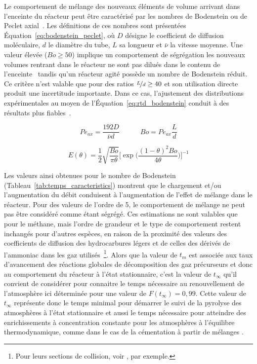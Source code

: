 Le comportement de mélange des nouveaux éléments de volume arrivant dans l'enceinte du réacteur peut être caractérisé par les nombres de Bodenstein ou de Peclet axial~\cite{Becker1998177,Fogler1999}.  Les définitions de ces nombres sont présentées Équation~\ref{eq:bodenstein_peclet}, où $D$ désigne le coefficient de diffusion moléculaire, $d$ le diamètre du tube, $L$ sa longueur et $\bar{\nu}$ la vitesse moyenne. Une valeur élevée ($Bo{}\geq{}50$) implique un comportement de ségrégation \textendash{} les nouveaux volumes rentrant dans le réacteur ne sont pas dilués dans le contenu de l'enceinte~\cite{Becker1998177} \textendash{} tandis qu'un réacteur agité possède un nombre de Bodenstein réduit. Ce critère n'est valable que pour des ratios $\nicefrac{L}{d}\geq40$ et son utilisation directe produit une incertitude importante. Dans ce cas, l'ajustement des distributions expérimentales au moyen de l'Équation~\ref{eq:rtd_bodenstein} conduit à des résultats plus fiables~\citep{Becker1998177}.

\begin{equation}
  Pe_{ax}=\frac{192D}{\bar{\nu}d}\quad\quad\quad 
  Bo=Pe_{ax}\frac{L}{d}
  \label{eq:bodenstein_peclet}
\end{equation}

\begin{equation}
  E(\theta)=\frac{1}{2}\sqrt{\frac{Bo}{\pi\theta}}
    \biggr[\exp\biggr(\frac{(1-\theta)^{2}Bo}{4\theta}\biggr)\biggr]^{-1}
  \label{eq:rtd_bodenstein}
\end{equation}

Les valeurs ainsi obtenues pour le nombre de Bodenstein (Tableau~\ref{tab:temps_caracteristics}) montrent que le chargement et/ou l'augmentation du débit conduisent à l'augmentation de l'effet de mélange dans le réacteur. Pour des valeurs de l'ordre de 5, le comportement de mélange ne peut pas être considéré comme étant ségrégé.  Ces estimations ne sont valables que pour le méthane, mais l'ordre de grandeur et le type de comportement restent inchangés pour d'autres espèces, en raison de la proximité des valeurs des coefficients de diffusion des hydrocarbures légers et de celles des dérivés de l'ammoniac dans les gaz utilisés~\footnote{Pour leurs sections de collision, voir \citet{Bird}, par exemple.}.  
Alors que la valeur de $t_{m}$ est associée aux taux d'avancement des réactions globales de décomposition des gaz précurseurs et donc au comportement du réacteur à l'état stationnaire, c'est la valeur de $t_{\infty}$ qu'il convient de considérer pour connaitre le temps nécessaire au renouvellement de l'atmosphère \textemdash{} ici déterminée pour une valeur de $F(t_{\infty})=0,99$. Cette valeur de $t_{\infty}$ représente donc le temps minimal pour démarrer le suivi de la pyrolyse des atmosphères à l'état stationnaire et aussi le temps nécessaire pour atteindre des enrichissements à concentration constante pour les atmosphères à l'équilibre thermodynamique, comme dans le cas de la cémentation à partir de mélanges .

